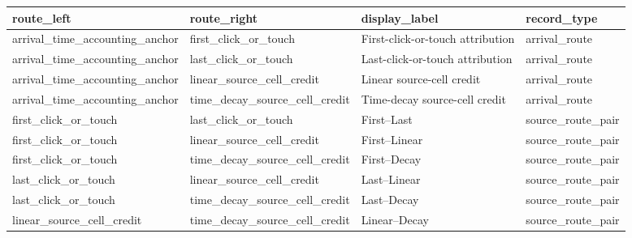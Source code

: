 \begin{tabular}{llll}
\toprule
route\_left & route\_right & display\_label & record\_type \\
\midrule
arrival\_time\_accounting\_anchor & first\_click\_or\_touch & First-click-or-touch attribution & arrival\_route \\
arrival\_time\_accounting\_anchor & last\_click\_or\_touch & Last-click-or-touch attribution & arrival\_route \\
arrival\_time\_accounting\_anchor & linear\_source\_cell\_credit & Linear source-cell credit & arrival\_route \\
arrival\_time\_accounting\_anchor & time\_decay\_source\_cell\_credit & Time-decay source-cell credit & arrival\_route \\
first\_click\_or\_touch & last\_click\_or\_touch & First–Last & source\_route\_pair \\
first\_click\_or\_touch & linear\_source\_cell\_credit & First–Linear & source\_route\_pair \\
first\_click\_or\_touch & time\_decay\_source\_cell\_credit & First–Decay & source\_route\_pair \\
last\_click\_or\_touch & linear\_source\_cell\_credit & Last–Linear & source\_route\_pair \\
last\_click\_or\_touch & time\_decay\_source\_cell\_credit & Last–Decay & source\_route\_pair \\
linear\_source\_cell\_credit & time\_decay\_source\_cell\_credit & Linear–Decay & source\_route\_pair \\
\bottomrule
\end{tabular}
